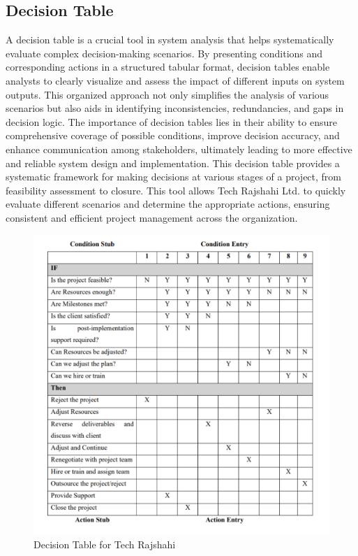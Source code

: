 \documentclass[12pt,a4paper]{article}
\begin{document}
\subsection{Decision Table}
A decision table is a crucial tool in system analysis that helps systematically evaluate complex
decision-making scenarios. By presenting conditions and corresponding actions in a structured
tabular format, decision tables enable analysts to clearly visualize and assess the impact of different
inputs on system outputs. This organized approach not only simplifies the analysis of various
scenarios but also aids in identifying inconsistencies, redundancies, and gaps in decision logic.
The importance of decision tables lies in their ability to ensure comprehensive coverage of possible
conditions, improve decision accuracy, and enhance communication among stakeholders, ultimately
leading to more effective and reliable system design and implementation. This decision table
provides a systematic framework for making decisions at various stages of a project, from feasibility
assessment to closure. This tool allows Tech Rajshahi Ltd. to quickly evaluate different scenarios
and determine the appropriate actions, ensuring consistent and efficient project management across
the organization.
\begin{figure}[H]
    \centering
    \includegraphics[width=\textwidth]{Fig/Decision-Table.png}
        \caption{Decision Table for Tech Rajshahi}
    \label{fig:decision_tree_tech}
\end{figure}
\end{document}
